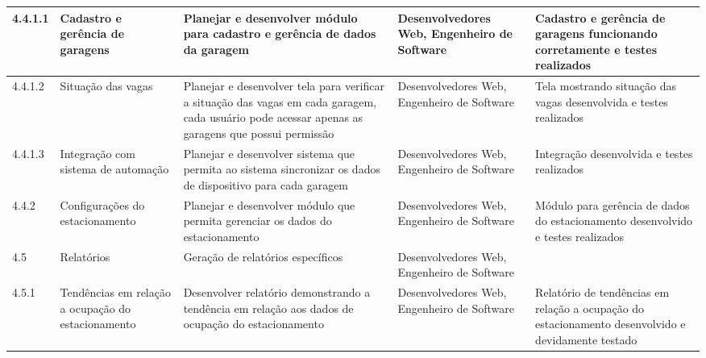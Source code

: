 \begin{landscape}
\begin{longtable}{@{\extracolsep{\fill}}  l  p{}  p{}  p{}  p{}  }
	\midrule
	4.4.1.1     & Cadastro e gerência de garagens                          & Planejar e desenvolver módulo para cadastro e gerência de dados da garagem                                                                                                     & Desenvolvedores Web, Engenheiro de Software                                                      & Cadastro e gerência de garagens funcionando corretamente e testes realizados                            \\*
	\midrule
	4.4.1.2     & Situação das vagas                                      & Planejar e desenvolver tela para verificar a situação das vagas em cada garagem, cada usuário pode acessar apenas as garagens que possui permissão                           & Desenvolvedores Web, Engenheiro de Software                                                      & Tela mostrando situação das vagas desenvolvida e testes realizados                                     \\*
	\midrule
	4.4.1.3     & Integração com sistema de automação                   & Planejar e desenvolver sistema que permita ao sistema sincronizar os dados de dispositivo para cada garagem                                                                      & Desenvolvedores Web, Engenheiro de Software                                                      & Integração desenvolvida e testes realizados                                                            \\*
	\midrule
	4.4.2       & Configurações do estacionamento                         & Planejar e desenvolver módulo que permita gerenciar os dados do estacionamento                                                                                                  & Desenvolvedores Web, Engenheiro de Software                                                      & Módulo para gerência de dados do estacionamento desenvolvido e testes realizados                       \\*
	\midrule
	4.5         & Relatórios                                               & Geração de relatórios específicos                                                                                                                                            & Desenvolvedores Web, Engenheiro de Software                                                      &                                                                                                          \\*
	\midrule
	4.5.1       & Tendências em relação a ocupação do estacionamento   & Desenvolver relatório demonstrando a tendência em relação aos dados de ocupação do estacionamento                                                                          & Desenvolvedores Web, Engenheiro de Software                                                      & Relatório de tendências em relação a ocupação do estacionamento desenvolvido e devidamente testado \\*

\end{longtable}
\end{landscape}

